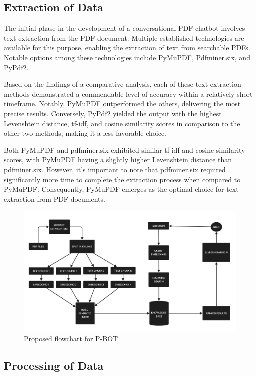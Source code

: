 \documentclass[fleqn,10pt]{thescipub} %
\begin{document}
\subsection{Extraction of Data}
The initial phase in the development of a conversational PDF chatbot involves text extraction from the PDF document. Multiple established technologies are available for this purpose, enabling the extraction of text from searchable PDFs. Notable options among these technologies include PyMuPDF, Pdfminer.six, and PyPdf2.

Based on the findings of a comparative analysis, each of these text extraction methods demonstrated a commendable level of accuracy within a relatively short timeframe. Notably, PyMuPDF outperformed the others, delivering the most precise results. Conversely, PyPdf2 yielded the output with the highest Levenshtein distance, tf-idf, and cosine similarity scores in comparison to the other two methods, making it a less favorable choice.

Both PyMuPDF and pdfminer.six exhibited similar tf-idf and cosine similarity scores, with PyMuPDF having a slightly higher Levenshtein distance than pdfminer.six. However, it's important to note that pdfminer.six required significantly more time to complete the extraction process when compared to PyMuPDF. Consequently, PyMuPDF emerges as the optimal choice for text extraction from PDF documents.

\begin{figure}
    \centering
    \includegraphics[width=\textwidth]{FLOWC}
    \caption{Proposed flowchart for P-BOT}
    \label{fig:your_image_label}
\end{figure}

\subsection{Processing of Data}
\end{document}
